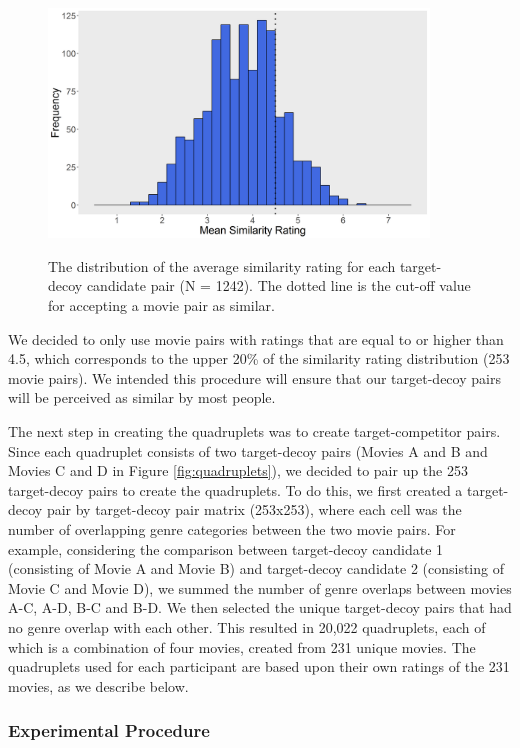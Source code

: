 \documentclass[12pt, a4paper]{article}
\begin{document}
\begin{figure}[htb!]
\centering
\captionsetup{justification=centering}
		\caption{The distribution of the average similarity rating for each target-decoy candidate pair (N = 1242). The dotted line is the cut-off value for accepting a movie pair as similar.}
\includegraphics[width=0.9\textwidth]{exp2_pilot.png}
\label{fig:exp2_pilot}
\end{figure}

We decided to only use movie pairs with ratings that are equal to or higher than 4.5, which corresponds to the upper 20\% of the similarity rating distribution (253 movie pairs). We intended this procedure will ensure that our target-decoy pairs will be perceived as similar by most people.

The next step in creating the quadruplets was to create target-competitor pairs. Since each quadruplet consists of two target-decoy pairs (Movies A and B and Movies C and D in Figure \ref{fig:quadruplets}), we decided to pair up the 253 target-decoy pairs to create the quadruplets. To do this, we first created a target-decoy pair by target-decoy pair matrix (253x253), where each cell was the number of overlapping genre categories between the two movie pairs. For example, considering the comparison between target-decoy candidate 1 (consisting of Movie A and Movie B) and target-decoy candidate 2 (consisting of Movie C and Movie D), we summed the number of genre overlaps between movies A-C, A-D, B-C and B-D. We then selected the unique target-decoy pairs that had no genre overlap with each other. This resulted in 20,022 quadruplets, each of which is a combination of four movies, created from 231 unique movies. The quadruplets used for each participant are based upon their own ratings of the 231 movies, as we describe below.

\subsubsection{Experimental Procedure}
\end{document}
